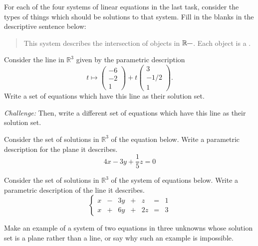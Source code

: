 \documentclass[cahier-main.tex]{subfiles}
\begin{document}
\begin{task}
For each of the four systems of linear equations in the last task, consider the types of things which should be solutions to that system. Fill in the blanks in the descriptive sentence below:
\begin{quotation}
This system describes the intersection of \underline{\hspace{1in}} objects in $\mathbb{R}^{\underline{\hspace{.1in}}}$. Each object is a \underline{\hspace{1in}}.
\end{quotation}
\end{task}


\begin{task}
Consider the line in $\mathbb{R}^3$ given by the parametric description
\[
t \mapsto \begin{pmatrix} -6\\-2\\1 \end{pmatrix} + t \begin{pmatrix} 3\\-1/2\\1\end{pmatrix}.
\]
Write a set of equations which have this line as their solution set.

\emph{Challenge:} Then, write a different set of equations which have this line as their solution set.
\end{task}


\begin{task}
Consider the set of solutions in $\mathbb{R}^3$ of the equation below. Write a parametric description for the plane it describes.
\[
4x-3y+ \frac{1}{5}z = 0
\]
\end{task}


\begin{task}
Consider the set of solutions in $\mathbb{R}^3$ of the system of equations below. Write a parametric description of the line it describes.
\[
\left\{\begin{array}{rrrrrrr}
x & - & 3y & + & z & = & 1 \\
x & + & 6y & + & 2z & = & 3
\end{array}\right.
\]
\end{task}

\begin{task}
Make an example of a system of two equations in three unknowns whose solution set is a plane rather than a line, or say why such an example is impossible.
\end{task}
\end{document}
